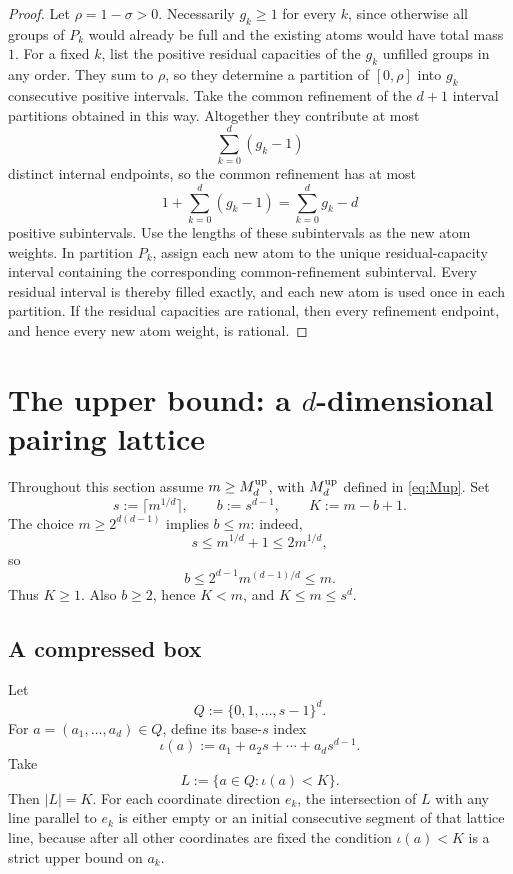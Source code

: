 \documentclass[11pt]{article}
\theoremstyle{definition}
\newcommand{\1}{\mathbf{1}}
\begin{document}
\begin{proof}
Let $\rho=1-\sigma>0$.  Necessarily $g_k\ge1$ for every $k$, since otherwise all groups of $P_k$ would already be full and the existing atoms would have total mass $1$.  For a fixed $k$, list the positive residual capacities of the $g_k$ unfilled groups in any order.  They sum to $\rho$, so they determine a partition of $[0,\rho]$ into $g_k$ consecutive positive intervals.  Take the common refinement of the $d+1$ interval partitions obtained in this way.  Altogether they contribute at most
\[
  \sum_{k=0}^d(g_k-1)
\]
distinct internal endpoints, so the common refinement has at most
\[
  1+\sum_{k=0}^d(g_k-1)=\sum_{k=0}^d g_k-d
\]
positive subintervals.  Use the lengths of these subintervals as the new atom weights.  In partition $P_k$, assign each new atom to the unique residual-capacity interval containing the corresponding common-refinement subinterval.  Every residual interval is thereby filled exactly, and each new atom is used once in each partition.  If the residual capacities are rational, then every refinement endpoint, and hence every new atom weight, is rational.
\end{proof}

\section{The upper bound: a $d$-dimensional pairing lattice}

Throughout this section assume $m\ge M_d^{\rm up}$, with $M_d^{\rm up}$ defined in \eqref{eq:Mup}.  Set
\begin{equation}\label{eq:s-b-K}
  s:=\lceil m^{1/d}\rceil,
  \qquad b:=s^{d-1},
  \qquad K:=m-b+1.
\end{equation}
The choice $m\ge2^{d(d-1)}$ implies $b\le m$: indeed,
\[
  s\le m^{1/d}+1\le2m^{1/d},
\]
so
\[
  b\le2^{d-1}m^{(d-1)/d}\le m.
\]
Thus $K\ge1$.  Also $b\ge2$, hence $K<m$, and $K\le m\le s^d$.

\subsection{A compressed box}

Let
\[
  Q:=\{0,1,\ldots,s-1\}^d.
\]
For $a=(a_1,\ldots,a_d)\in Q$, define its base-$s$ index
\[
  \iota(a):=a_1+a_2s+\cdots+a_ds^{d-1}.
\]
Take
\begin{equation}\label{eq:L}
  L:=\{a\in Q:\iota(a)<K\}.
\end{equation}
Then $|L|=K$.  For each coordinate direction $e_k$, the intersection of $L$ with any line parallel to $e_k$ is either empty or an initial consecutive segment of that lattice line, because after all other coordinates are fixed the condition $\iota(a)<K$ is a strict upper bound on $a_k$.
\end{document}
